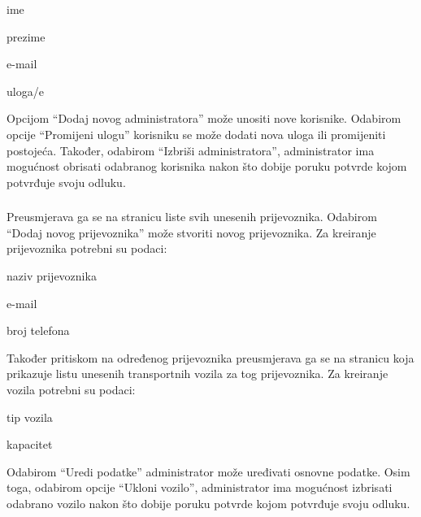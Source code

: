 		\begin{packed_item}
			\item ime
			\item prezime
			\item e-mail
			\item uloga/e
		\end{packed_item}
		
		\noindent Opcijom “Dodaj novog administratora” može unositi nove korisnike. Odabirom opcije “Promijeni ulogu” korisniku se može dodati nova uloga ili promijeniti postojeća. Također, odabirom “Izbriši administratora”, administrator ima mogućnost obrisati odabranog korisnika nakon što dobije poruku potvrde kojom potvrđuje svoju odluku. 
		
		\subsubsection{\noindent {}}
		
		Preusmjerava ga se na stranicu liste svih unesenih prijevoznika. Odabirom “Dodaj novog prijevoznika” može stvoriti novog prijevoznika. Za kreiranje prijevoznika potrebni su podaci: 
		
		\begin{packed_item}
			\item naziv prijevoznika 
			\item e-mail
			\item broj telefona
		\end{packed_item}
		
		\noindent Također pritiskom na određenog prijevoznika preusmjerava ga se na stranicu koja prikazuje listu unesenih transportnih vozila za tog prijevoznika. Za kreiranje vozila potrebni su podaci: 
		
		\begin{packed_item}
			\item tip vozila 
			\item kapacitet
		\end{packed_item}
		
		 \noindent Odabirom “Uredi podatke” administrator može uređivati osnovne podatke. Osim toga, odabirom opcije “Ukloni vozilo”, administrator ima mogućnost izbrisati odabrano vozilo nakon što dobije poruku potvrde kojom potvrđuje svoju odluku. 
		
		\subsubsection{\noindent {}}
		

